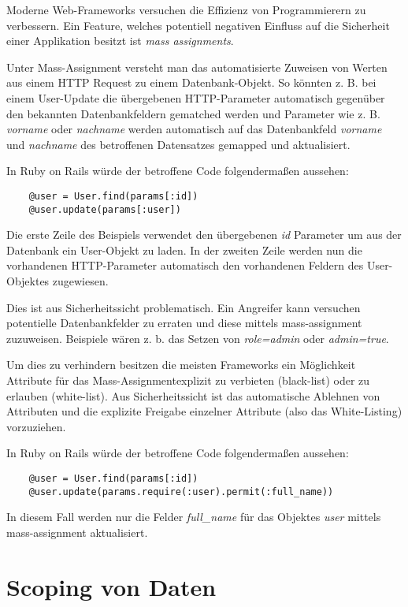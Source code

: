 Moderne Web-Frameworks versuchen die Effizienz von Programmierern zu verbessern. Ein Feature, welches potentiell negativen Einfluss auf die Sicherheit einer Applikation besitzt ist \textit{mass assignments}.

Unter Mass-Assignment versteht man das automatisierte Zuweisen von Werten aus einem HTTP Request zu einem Datenbank-Objekt. So könnten z. B. bei einem User-Update die übergebenen HTTP-Parameter automatisch gegenüber den bekannten Datenbankfeldern gematched werden und Parameter wie z. B. \textit{vorname} oder \textit{nachname} werden automatisch auf das Datenbankfeld \textit{vorname} und \textit{nachname} des betroffenen Datensatzes gemapped und aktualisiert.

In Ruby on Rails würde der betroffene Code folgendermaßen aussehen:

\begin{verbatim}
	@user = User.find(params[:id])
	@user.update(params[:user])
\end{verbatim}

Die erste Zeile des Beispiels verwendet den übergebenen \textit{id} Parameter um aus der Datenbank ein User-Objekt zu laden. In der zweiten Zeile werden nun die vorhandenen HTTP-Parameter automatisch den vorhandenen Feldern des User-Objektes zugewiesen.

Dies ist aus Sicherheitssicht problematisch. Ein Angreifer kann versuchen potentielle Datenbankfelder zu erraten und diese mittels mass-assignment zuzuweisen. Beispiele wären z. b. das Setzen von \textit{role=admin} oder \textit{admin=true}.

Um dies zu verhindern besitzen die meisten Frameworks ein Möglichkeit Attribute für das Mass-Assignmentexplizit zu verbieten (black-list) oder zu erlauben (white-list). Aus Sicherheitssicht ist das automatische Ablehnen von Attributen und die explizite Freigabe einzelner Attribute (also das White-Listing) vorzuziehen.

In Ruby on Rails würde der betroffene Code folgendermaßen aussehen:

\begin{verbatim}
	@user = User.find(params[:id])
	@user.update(params.require(:user).permit(:full_name))
\end{verbatim}

In diesem Fall werden nur die Felder \textit{full\_name} für das Objektes \textit{user} mittels mass-assignment aktualisiert.

\section{Scoping von Daten}

